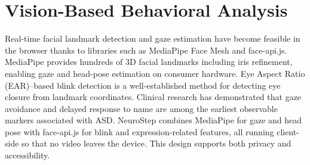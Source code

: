 \documentclass[12pt,a4paper]{report}
\begin{document}
\section{Vision-Based Behavioral Analysis}
Real-time facial landmark detection and gaze estimation have become feasible in the browser thanks to libraries such as MediaPipe Face Mesh and face-api.js. MediaPipe provides hundreds of 3D facial landmarks including iris refinement, enabling gaze and head-pose estimation on consumer hardware. Eye Aspect Ratio (EAR)--based blink detection is a well-established method for detecting eye closure from landmark coordinates. Clinical research has demonstrated that gaze avoidance and delayed response to name are among the earliest observable markers associated with ASD. NeuroStep combines MediaPipe for gaze and head pose with face-api.js for blink and expression-related features, all running client-side so that no video leaves the device. This design supports both privacy and accessibility.
\end{document}
